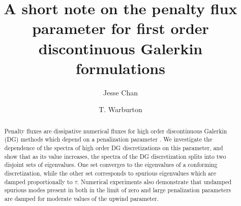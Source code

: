 \documentclass[preprint,10pt]{elsarticle}
\date{}
\begin{document}
\begin{frontmatter}
\title{A short note on the penalty flux parameter for first order discontinuous Galerkin formulations}

\author[rice]{Jesse Chan}
\author[vt]{T. Warburton}
\address[rice]{Department of Computational and Applied Mathematics, Rice University, 6100 Main St, Houston, TX, 77005}
\address[vt]{Department of Mathematics, Virginia Tech, 225 Stanger Street, Blacksburg, VA 24061-0123}

\address{}

\begin{abstract}
Penalty fluxes are dissipative numerical fluxes for high order discontinuous Galerkin (DG) methods which depend on a penalization parameter \cite{warburton2013low, ye2016discontinuous}.  We investigate the dependence of the spectra of high order DG discretizations on this parameter, and show that as its value increases, the spectra of the DG discretization splits into two disjoint sets of eigenvalues.  One set converges to the eigenvalues of a conforming discretization, while the other set corresponds to spurious eigenvalues which are damped proportionally to $\tau$.  Numerical experiments also demonstrate that undamped spurious modes present in both in the limit of zero and large penalization parameters are damped for moderate values of the upwind parameter.  
\end{abstract}
\end{frontmatter}


\end{document}
